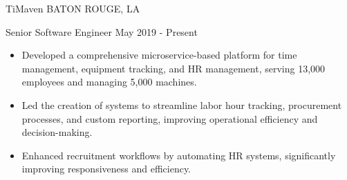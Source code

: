 \documentclass[10pt,a4paper]{article}
\begin{document}







\spacedhrule{0em}{-1em}


\headedsection
{TiMaven}
{\textsc{BATON ROUGE, LA}}
{
  \headedsubsection
  {Senior Software Engineer}
  {May 2019 - Present}
  {
    \begin{itemize}
      \item Developed a comprehensive microservice-based platform for time management, equipment tracking, and HR management, serving 13,000 employees and managing 5,000 machines.
      \item Led the creation of systems to streamline labor hour tracking, procurement processes, and custom reporting, improving operational efficiency and decision-making.
      \item Enhanced recruitment workflows by automating HR systems, significantly improving responsiveness and efficiency.
    \end{itemize}
  }
}
\end{document}
